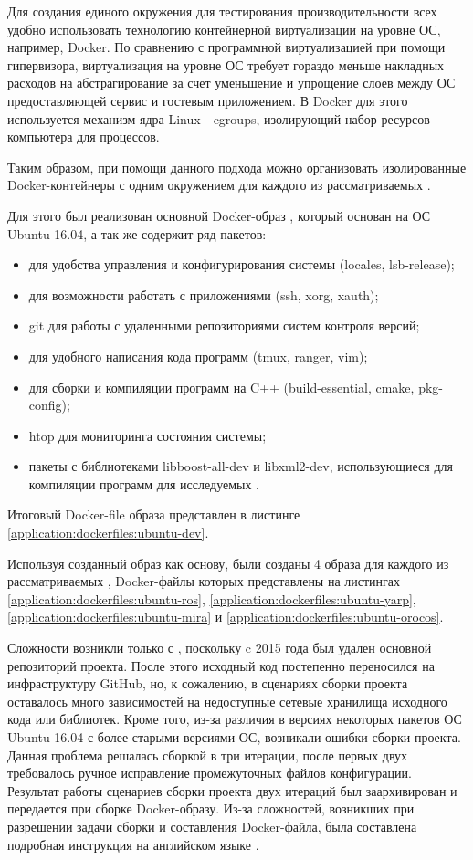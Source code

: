 Для создания единого окружения для тестирования производительности всех \marm{} удобно использовать технологию контейнерной виртуализации на уровне ОС, например, Docker. По сравнению с программной виртуализацией при помощи гипервизора, виртуализация на уровне ОС требует гораздо меньше накладных расходов на абстрагирование за счет уменьшение и упрощение слоев между ОС предоставляющей сервис и гостевым приложением. В Docker для этого используется механизм ядра Linux - cgroups, изолирующий набор ресурсов компьютера для процессов. 

Таким образом, при помощи данного подхода можно организовать изолированные Docker-контейнеры с одним окружением для каждого из рассматриваемых \marm{}.

Для этого был реализован основной Docker-образ , который основан на ОС Ubuntu 16.04, а так же содержит ряд пакетов:
\begin{itemize}[noitemsep]
	\item для удобства управления и конфигурирования системы (locales, lsb-release);
	\item для возможности работать с  приложениями (ssh, xorg, xauth);
	\item git для работы с удаленными репозиториями систем контроля версий;
	\item для удобного написания кода программ (tmux, ranger, vim);
	\item для сборки и компиляции программ на C++ (build-essential, cmake, pkg-config);
	\item htop для мониторинга состояния системы;
	\item пакеты с библиотеками libboost-all-dev и libxml2-dev, использующиеся для компиляции программ для исследуемых \marm{}.
\end{itemize}

Итоговый Docker-file образа  представлен в листинге \ref{application:dockerfiles:ubuntu-dev}.

Используя созданный образ как основу, были созданы 4 образа для каждого из рассматриваемых \marm{}, Docker-файлы которых представлены на листингах \ref{application:dockerfiles:ubuntu-ros}, \ref{application:dockerfiles:ubuntu-yarp}, \ref{application:dockerfiles:ubuntu-mira} и \ref{application:dockerfiles:ubuntu-orocos}. 

Сложности возникли только с \toolchain{}, поскольку c 2015 года был удален основной репозиторий проекта. После этого исходный код постепенно переносился на инфраструктуру GitHub, но, к сожалению, в сценариях сборки проекта оставалось много зависимостей на недоступные сетевые хранилища исходного кода или библиотек. Кроме того, из-за различия в версиях некоторых пакетов ОС Ubuntu 16.04 с более старыми версиями ОС, возникали ошибки сборки проекта. Данная проблема решалась сборкой в три итерации, после первых двух требовалось ручное исправление промежуточных файлов конфигурации. Результат работы сценариев сборки проекта двух итераций был заархивирован и передается при сборке Docker-образу. Из-за сложностей, возникших при разрешении задачи сборки \toolchain{} и составления Docker-файла, была составлена подробная инструкция на английском языке . 

